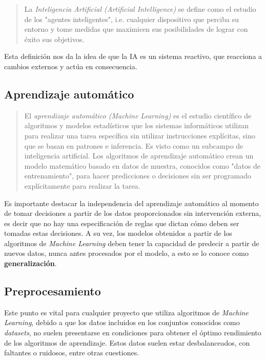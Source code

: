 \documentclass[a4paper,12pt]{article}
\begin{document}
\begin{quote}
	La \textit{Inteligencia Artificial (Artificial Intelligence)} se define como el estudio de los "agentes inteligentes", i.e. cualquier dispositivo que perciba su entorno y tome medidas que maximicen sus posibilidades de lograr con éxito sus objetivos.
	  
	\hfill \citet{poole1998}
\end{quote}

Esta definición nos da la idea de que la IA es un sistema reactivo, que reacciona a cambios externos y actúa en consecuencia.

\subsection{Aprendizaje automático} \label{machinelearning}

\begin{quote}
	El \textit{aprendizaje automático (Machine Learning)} es el estudio científico de algoritmos y modelos estadísticos que los sistemas informáticos utilizan para realizar una tarea específica sin utilizar instrucciones explícitas, sino que se basan en patrones e inferencia. Es visto como un subcampo de inteligencia artificial. Los algoritmos de aprendizaje automático crean un modelo matemático basado en datos de muestra, conocidos como "datos de entrenamiento", para hacer predicciones o decisiones sin ser programado explícitamente para realizar la tarea.
	  
	\hfill \citet{bishop2006pattern}
\end{quote}

Es importante destacar la independencia del aprendizaje automático al momento de tomar decisiones a partir de los datos proporcionados sin intervención externa, es decir que no hay una especificación de reglas que dictan cómo deben ser tomadas estas decisiones. A su vez, los modelos obtenidos a partir de los algoritmos de \textit{Machine Learning} deben tener la capacidad de predecir a partir de nuevos datos, nunca antes procesados por el modelo, a esto se lo conoce como \textbf{generalización}. 

\subsection{Preprocesamiento} \label{preprocessing}
Este punto es vital para cualquier proyecto que utiliza algoritmos de \textit{Machine Learning}, debido a que los datos incluidos en los conjuntos conocidos como \textit{datasets}, no suelen presentarse en condiciones para obtener el óptimo rendimiento de los algoritmos de aprendizaje. Estos datos suelen estar desbalanceados, con faltantes o ruidosos, entre otras cuestiones. 
\end{document}
